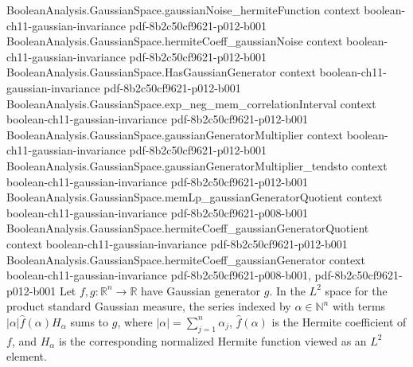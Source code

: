 \begin{theorem}
\proofstep
  {BooleanAnalysis.GaussianSpace.gaussianNoise_hermiteFunction}
  {context}
  {boolean-ch11-gaussian-invariance}
  {pdf-8b2c50cf9621-p012-b001}
\proofstep
  {BooleanAnalysis.GaussianSpace.hermiteCoeff_gaussianNoise}
  {context}
  {boolean-ch11-gaussian-invariance}
  {pdf-8b2c50cf9621-p012-b001}
\proofstep
  {BooleanAnalysis.GaussianSpace.HasGaussianGenerator}
  {context}
  {boolean-ch11-gaussian-invariance}
  {pdf-8b2c50cf9621-p012-b001}
\proofstep
  {BooleanAnalysis.GaussianSpace.exp_neg_mem_correlationInterval}
  {context}
  {boolean-ch11-gaussian-invariance}
  {pdf-8b2c50cf9621-p012-b001}
\proofstep
  {BooleanAnalysis.GaussianSpace.gaussianGeneratorMultiplier}
  {context}
  {boolean-ch11-gaussian-invariance}
  {pdf-8b2c50cf9621-p012-b001}
\proofstep
  {BooleanAnalysis.GaussianSpace.gaussianGeneratorMultiplier_tendsto}
  {context}
  {boolean-ch11-gaussian-invariance}
  {pdf-8b2c50cf9621-p012-b001}
\proofstep
  {BooleanAnalysis.GaussianSpace.memLp_gaussianGeneratorQuotient}
  {context}
  {boolean-ch11-gaussian-invariance}
  {pdf-8b2c50cf9621-p008-b001}
\proofstep
  {BooleanAnalysis.GaussianSpace.hermiteCoeff_gaussianGeneratorQuotient}
  {context}
  {boolean-ch11-gaussian-invariance}
  {pdf-8b2c50cf9621-p012-b001}
\proofstep
  {BooleanAnalysis.GaussianSpace.hermiteCoeff_gaussianGenerator}
  {context}
  {boolean-ch11-gaussian-invariance}
  {pdf-8b2c50cf9621-p008-b001,
    pdf-8b2c50cf9621-p012-b001}
Let $f,g:\mathbb R^n\to\mathbb R$ have Gaussian generator $g$. In the $L^2$ space for
the product standard Gaussian measure, the series indexed by $\alpha\in\mathbb N^n$ with
terms $|\alpha|\widehat f(\alpha)H_\alpha$ sums to $g$, where
$|\alpha|=\sum_{j=1}^n\alpha_j$, $\widehat f(\alpha)$ is the Hermite coefficient of $f$,
and $H_\alpha$ is the corresponding normalized Hermite function viewed as an $L^2$
element.
\end{theorem}

